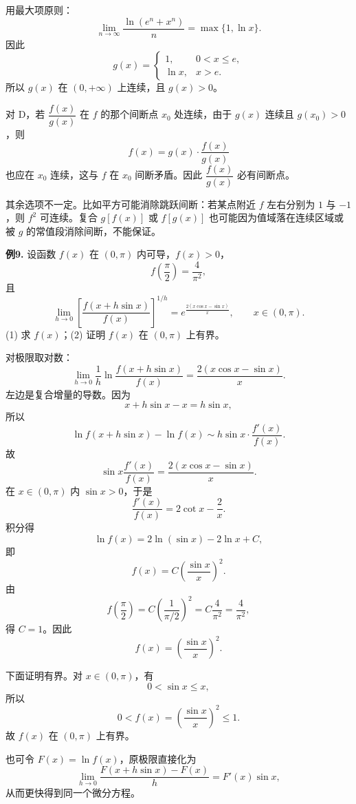 \begin{solutionblock}

用最大项原则：
\[
\lim_{n\to\infty}\frac{\ln(e^n+x^n)}{n}
=\max\{1,\ln x\}.
\]
因此
\[
g(x)=
\begin{cases}
1,&0<x\le e,\\
\ln x,&x>e.
\end{cases}
\]
所以 \(g(x)\) 在 \((0,+\infty)\) 上连续，且 \(g(x)>0\)。

对 D，若 \(\dfrac{f(x)}{g(x)}\) 在 \(f\) 的那个间断点 \(x_0\) 处连续，由于 \(g(x)\) 连续且 \(g(x_0)>0\)，则
\[
f(x)=g(x)\cdot\frac{f(x)}{g(x)}
\]
也应在 \(x_0\) 连续，这与 \(f\) 在 \(x_0\) 间断矛盾。因此 \(\dfrac{f(x)}{g(x)}\) 必有间断点。

其余选项不一定。比如平方可能消除跳跃间断：若某点附近 \(f\) 左右分别为 \(1\) 与 \(-1\)，则 \(f^2\) 可连续。复合 \(g[f(x)]\) 或 \(f[g(x)]\) 也可能因为值域落在连续区域或被 \(g\) 的常值段消除间断，不能保证。

\end{solutionblock}

\begin{problemblock}
\textbf{例9.} 设函数 \(f(x)\) 在 \((0,\pi)\) 内可导，\(f(x)>0\)，
\[
f\left(\frac\pi2\right)=\frac4{\pi^2},
\]
且
\[
\lim_{h\to0}\left[\frac{f(x+h\sin x)}{f(x)}\right]^{1/h}
=e^{\frac{2(x\cos x-\sin x)}{x}},\qquad x\in(0,\pi).
\]
(1) 求 \(f(x)\)；(2) 证明 \(f(x)\) 在 \((0,\pi)\) 上有界。
\end{problemblock}

\begin{solutionblock}

对极限取对数：
\[
\lim_{h\to0}\frac1h
\ln\frac{f(x+h\sin x)}{f(x)}
=\frac{2(x\cos x-\sin x)}{x}.
\]
左边是复合增量的导数。因为
\[
x+h\sin x-x=h\sin x,
\]
所以
\[
\ln f(x+h\sin x)-\ln f(x)
\sim h\sin x\cdot \frac{f'(x)}{f(x)}.
\]
故
\[
\sin x\frac{f'(x)}{f(x)}
=\frac{2(x\cos x-\sin x)}{x}.
\]
在 \(x\in(0,\pi)\) 内 \(\sin x>0\)，于是
\[
\frac{f'(x)}{f(x)}
=2\cot x-\frac2x.
\]
积分得
\[
\ln f(x)=2\ln(\sin x)-2\ln x+C,
\]
即
\[
f(x)=C\left(\frac{\sin x}{x}\right)^2.
\]
由
\[
f\left(\frac\pi2\right)=C\left(\frac{1}{\pi/2}\right)^2
=C\frac4{\pi^2}
=\frac4{\pi^2},
\]
得 \(C=1\)。因此
\[
f(x)=\left(\frac{\sin x}{x}\right)^2.
\]

下面证明有界。对 \(x\in(0,\pi)\)，有
\[
0<\sin x\le x,
\]
所以
\[
0<f(x)=\left(\frac{\sin x}{x}\right)^2\le1.
\]
故 \(f(x)\) 在 \((0,\pi)\) 上有界。

也可令 \(F(x)=\ln f(x)\)，原极限直接化为
\[
\lim_{h\to0}\frac{F(x+h\sin x)-F(x)}{h}
=F'(x)\sin x,
\]
从而更快得到同一个微分方程。

\end{solutionblock}


